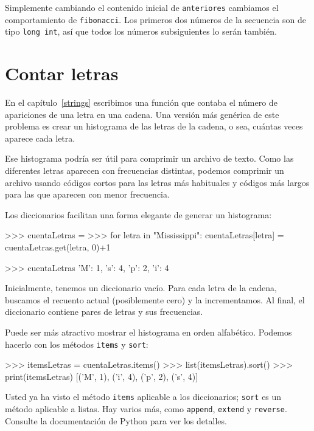 Simplemente cambiando el contenido inicial de \texttt{anteriores}
cambiamos el comportamiento de \texttt{fibonacci}. Los primeros dos
números de la secuencia son de tipo \texttt{long int}, así que todos
los números subsiguientes lo serán también.

 

\section{Contar letras}

  

En el capítulo~\ref{strings} escribimos una función que contaba
el número de apariciones de una letra en una cadena. Una versión más
genérica de este problema es crear un histograma de las letras de
la cadena, o sea, cuántas veces aparece cada letra.

Ese histograma podría ser útil para comprimir un archivo de texto.
Como las diferentes letras aparecen con frecuencias distintas, podemos
comprimir un archivo usando códigos cortos para las letras más habituales
y códigos más largos para las que aparecen con menor frecuencia.

Los diccionarios facilitan una forma elegante de generar un histograma:
\begin{pyconcode}
>>> cuentaLetras = {}
>>> for letra in "Mississippi":
      cuentaLetras[letra] = cuentaLetras.get(letra, 0)+1

>>> cuentaLetras
{'M': 1, 's': 4, 'p': 2, 'i': 4}
\end{pyconcode}

Inicialmente, tenemos un diccionario vacío. Para cada letra de la
cadena, buscamos el recuento actual (posiblemente cero) y la incrementamos.
Al final, el diccionario contiene pares de letras y sus frecuencias.

Puede ser más atractivo mostrar el histograma en orden alfabético.
Podemos hacerlo con los métodos \texttt{items} y \texttt{sort}:
\begin{pyconcode}
>>> itemsLetras = cuentaLetras.items()
>>> list(itemsLetras).sort()
>>> print(itemsLetras)
[('M', 1), ('i', 4), ('p', 2), ('s', 4)]
\end{pyconcode}

Usted ya ha visto el método \texttt{items} aplicable a los diccionarios;
\texttt{sort} es un método aplicable a listas. Hay varios más, como
\texttt{append}, \texttt{extend} y \texttt{reverse}. Consulte la documentación
de Python para ver los detalles.

